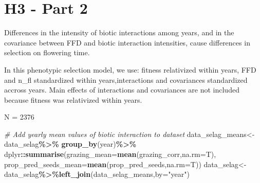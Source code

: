 \documentclass[
]{article}
\newenvironment{Shaded}{\begin{snugshade}}{\end{snugshade}}
\newcommand{\CommentTok}[1]{\textcolor[rgb]{0.56,0.35,0.01}{\textit{#1}}}
\newcommand{\DataTypeTok}[1]{\textcolor[rgb]{0.13,0.29,0.53}{#1}}
\newcommand{\KeywordTok}[1]{\textcolor[rgb]{0.13,0.29,0.53}{\textbf{#1}}}
\newcommand{\NormalTok}[1]{#1}
\newcommand{\OperatorTok}[1]{\textcolor[rgb]{0.81,0.36,0.00}{\textbf{#1}}}
\newcommand{\StringTok}[1]{\textcolor[rgb]{0.31,0.60,0.02}{#1}}
\begin{document}
\hypertarget{h3---part-2}{%
\section{H3 - Part 2}\label{h3---part-2}}

Differences in the intensity of biotic interactions among years, and in
the covariance between FFD and biotic interaction intensities, cause
differences in selection on flowering time.

In this phenotypic selection model, we use: fitness relativized within
years, FFD and n\_fl standardized within years,interactions and
covariances standardized accross years. Main effects of interactions and
covariances are not included because fitness was relativized within
years.

N = 2376

\begin{Shaded}
\begin{Highlighting}[]
\CommentTok{\# Add yearly mean values of biotic interaction to dataset }
\NormalTok{data\_selag\_means\textless{}{-}data\_selag}\OperatorTok{\%\textgreater{}\%}
\StringTok{  }\KeywordTok{group\_by}\NormalTok{(year)}\OperatorTok{\%\textgreater{}\%}
\StringTok{  }\NormalTok{dplyr}\OperatorTok{::}\KeywordTok{summarise}\NormalTok{(}\DataTypeTok{grazing\_mean=}\KeywordTok{mean}\NormalTok{(grazing\_corr,}\DataTypeTok{na.rm=}\NormalTok{T),}
                   \DataTypeTok{prop\_pred\_seeds\_mean=}\KeywordTok{mean}\NormalTok{(prop\_pred\_seeds,}\DataTypeTok{na.rm=}\NormalTok{T))}
\NormalTok{data\_selag\textless{}{-}data\_selag}\OperatorTok{\%\textgreater{}\%}\KeywordTok{left\_join}\NormalTok{(data\_selag\_means,}\DataTypeTok{by=}\StringTok{"year"}\NormalTok{)}
\end{Highlighting}
\end{Shaded}
\end{document}
